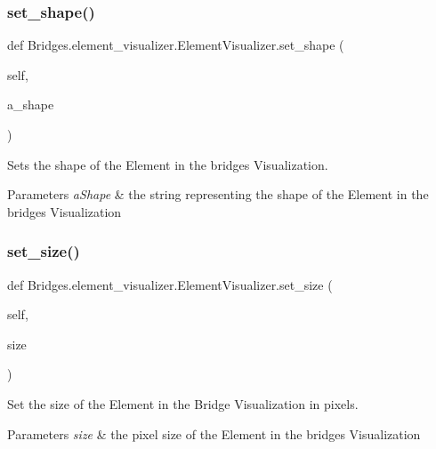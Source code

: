 \subsubsection{\texorpdfstring{set\+\_\+shape()}{set\_shape()}}
{\footnotesize\ttfamily def Bridges.\+element\+\_\+visualizer.\+Element\+Visualizer.\+set\+\_\+shape (\begin{DoxyParamCaption}\item[{}]{self,  }\item[{}]{a\+\_\+shape }\end{DoxyParamCaption})}



Sets the shape of the Element in the bridges Visualization. 


\begin{DoxyParams}{Parameters}
{\em a\+Shape} & the string representing the shape of the Element in the bridges Visualization \\
\hline
\end{DoxyParams}
\mbox{\label{class_bridges_1_1element__visualizer_1_1_element_visualizer_ad3d6b884bca4cd65a300d7ca5a9a6ebb}} 
\subsubsection{\texorpdfstring{set\+\_\+size()}{set\_size()}}
{\footnotesize\ttfamily def Bridges.\+element\+\_\+visualizer.\+Element\+Visualizer.\+set\+\_\+size (\begin{DoxyParamCaption}\item[{}]{self,  }\item[{}]{size }\end{DoxyParamCaption})}



Set the size of the Element in the Bridge Visualization in pixels. 


\begin{DoxyParams}{Parameters}
{\em size} & the pixel size of the Element in the bridges Visualization \\
\hline
\end{DoxyParams}


